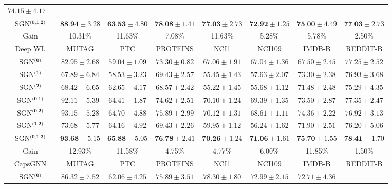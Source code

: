 \documentclass[10pt,journal,compsoc]{IEEEtran}
\begin{document}
\begin{table*}[!t]
\begin{tabular}{c|cccccccc}
$74.15\pm{4.17}$\\
\multicolumn{2}{c|}{SGN$^{\textbf{(0,1,2)}}$}&$\textbf{88.94}\pm{3.28}$&  $\textbf{63.53}\pm{4.80}$&  $\textbf{78.08}\pm{1.41}$&  $\textbf{77.03}\pm{2.73}$&  $\textbf{72.92}\pm{1.25}$&$\textbf{75.00}\pm{4.49}$&
$\textbf{77.03}\pm{2.73}$\\
\hline
\multicolumn{2}{c|}{Gain}&10.31\%&  11.63\%&  7.08\%&  11.63\%&  5.28\%&  5.78\%&  2.50\%\\
\hline
\multicolumn{2}{c|}{Deep WL}&MUTAG&PTC&PROTEINS&NCI1&NCI109&IMDB-B&REDDIT-B\\
\hline
\multicolumn{2}{c|}{SGN$^{\textbf{(0)}}$}&$82.95\pm{2.68}$&  $59.04\pm{1.09}$&  $73.30\pm{0.82}$&  $67.06\pm{1.91}$&  $67.04\pm{1.36}$&  $67.50\pm{2.45}$&
$77.25\pm{2.52}$\\
\multicolumn{2}{c|}{SGN$^{\textbf{(1)}}$}&$67.89\pm{6.84}$&  $58.53\pm{3.23}$&  $69.43\pm{2.57}$&  $55.45\pm{1.43}$&  $57.63\pm{2.07}$&  $73.30\pm{2.38}$&
$76.93\pm{3.68}$\\
\multicolumn{2}{c|}{SGN$^{\textbf{(2)}}$}&$68.42\pm{6.65}$&  $62.65\pm{4.17}$&  $68.57\pm{2.42}$&  $55.22\pm{1.45}$&  $55.68\pm{1.12}$&  $71.48\pm{2.48}$&
$75.29\pm{4.35}$\\
\multicolumn{2}{c|}{SGN$^{\textbf{(0,1)}}$}&$92.11\pm{5.39}$&  $64.41\pm{1.87}$&  $74.62\pm{2.51}$&  $70.10\pm{1.24}$&  $69.39\pm{1.35}$&  $73.50\pm{2.87}$&
$77.35\pm{2.47}$\\
\multicolumn{2}{c|}{SGN$^{\textbf{(0,2)}}$}&$93.15\pm{5.28}$&  $64.70\pm{4.88}$&  $75.89\pm{2.99}$&  $70.12\pm{1.31}$&  $68.61\pm{1.11}$&  $74.36\pm{2.22}$&
$76.92\pm{3.13}$\\
\multicolumn{2}{c|}{SGN$^{\textbf{(1,2)}}$}&$73.68\pm{5.77}$&  $64.16\pm{4.92}$&  $69.43\pm{2.26}$&  $59.95\pm{1.12}$&  $56.24\pm{1.62}$&  $71.90\pm{2.51}$&
$76.20\pm{5.06}$\\
\multicolumn{2}{c|}{SGN$^{\textbf{(0,1,2)}}$}&$\textbf{93.68}\pm{5.15}$&  $\textbf{65.88}\pm{5.05}$&  $\textbf{76.78}\pm{2.41}$&  $\textbf{70.26}\pm{1.24}$&  $\textbf{71.06}\pm{1.61}$&  $\textbf{75.70}\pm{1.55}$&
$\textbf{78.41}\pm{1.70}$\\
\hline
\multicolumn{2}{c|}{Gain}&12.93\%&  11.58\%&  4.75\%&  4.77\%&  6.00\%&  11.85\%&  1.50\%\\
\hline
\multicolumn{2}{c|}{CapsGNN}&MUTAG&PTC&PROTEINS&NCI1&NCI109&IMDB-B&REDDIT-B\\
\hline
\multicolumn{2}{c|}{SGN$^{\textbf{(0)}}$}&$86.32\pm{7.52}$&  $62.06\pm{4.25}$&  $75.89\pm{3.51}$&  $78.30\pm{1.80}$&  $72.99\pm{2.15}$&  $72.71\pm{4.36}$&

\end{tabular}
\end{table*}
\end{document}

